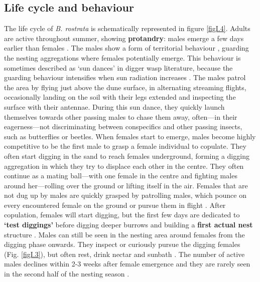 \documentclass[10pt, twoside]{book} %
\begin{document}
	\subsection{Life cycle and behaviour}
	The life cycle of \textit{B. rostrata} is schematically represented in figure \ref{figI.4}. Adults are active throughout summer, showing \textbf{protandry}: males emerge a few days earlier than females \citep{wiklund1977, schone1981, evans2007}. The males show a form of territorial behaviour \citep{asis2006}, guarding the nesting aggregations where females potentially emerge. This behaviour is sometimes described as `sun dances' in digger wasp literature, because the guarding behaviour intensifies when sun radiation increases \citep{rau1918, evans1957, schone1981, evans2007}. The males patrol the area by flying just above the dune surface, in alternating streaming flights, occasionally landing on the soil with their legs extended and inspecting the surface with their antennae. During this sun dance, they quickly launch themselves towards other passing males to chase them away, often---in their eagerness---not discriminating between conspecifics and other passing insects, such as butterflies or beetles. When females start to emerge, males become highly competitive to be the first male to grasp a female individual to copulate. They often start digging in the sand to reach females underground, forming a digging aggregation in which they try to displace each other in the centre. They often continue as a mating ball---with one female in the centre and fighting males around her---rolling over the ground or lifting itself in the air. Females that are not dug up by males are quickly grasped by patrolling males, which pounce on every encountered female on the ground or pursue them in flight \citep{schone1981}. After copulation, females will start digging, but the first few days are dedicated to \textbf{`test diggings'} before digging deeper burrows and building a \textbf{first actual nest} structure \citep{schone1981, larsson1989}. Males can still be seen in the nesting area around females from the digging phase onwards. They inspect or curiously pursue the digging females (Fig. \ref{figI.3}), but often rest, drink nectar and sunbath \citep{schone1981}. The number of active males declines within 2-3 weeks after female emergence and they are rarely seen in the second half of the nesting season \citep{evans2007}.\\
	
\end{document}
